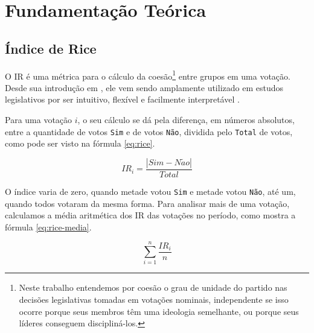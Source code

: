 \chapter{Fundamentação Teórica}\label{cap:fundamentacao}

\section{Índice de Rice}

O \gls{IR} é uma métrica para o cálculo da coesão\footnote{Neste trabalho
entendemos por coesão o grau de unidade do partido nas decisões legislativas
tomadas em votações nominais, independente se isso ocorre porque seus membros
têm uma ideologia semelhante, ou porque seus líderes conseguem discipliná-los.}
entre grupos em uma votação. Desde sua introdução em \cite{Rice1924}, ele vem
sendo amplamente utilizado em estudos legislativos por ser intuitivo, flexível
e facilmente interpretável \cite{Neiva2011}.

Para uma votação $i$, o seu cálculo se dá pela diferença, em números absolutos,
entre a quantidade de votos \verb|Sim| e de votos \verb|Não|, dividida pelo
\verb|Total| de votos, como pode ser visto na fórmula \ref{eq:rice}.

\begin{equation}\label{eq:rice}
  IR_i = \frac{|Sim - N\tilde{a}o|}{Total}
\end{equation}

O índice varia de zero, quando metade votou \verb|Sim| e metade votou
\verb|Não|, até um, quando todos votaram da mesma forma. Para analisar mais de
uma votação, calculamos a média aritmética dos \gls{IR} das votações no
período, como mostra a fórmula \ref{eq:rice-media}.

\begin{equation}\label{eq:rice-media}
  \sum_{i=1}^{n} \frac{IR_i}{n}
\end{equation}


